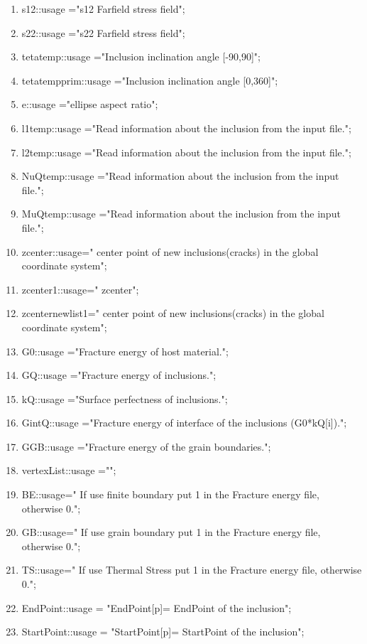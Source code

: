\documentclass[12pt]{article}
\numberwithin{equation}{subsection}
\begin{document}
\begin{enumerate}
\item s12::usage ="s12 Farfield stress field";
\item s22::usage ="s22 Farfield stress field";
\item tetatemp::usage ="Inclusion inclination angle [-90,90]";
\item tetatempprim::usage ="Inclusion inclination angle [0,360]";
\item e::usage ="ellipse aspect ratio";
\item l1temp::usage ="Read information about the inclusion from the input file.";
\item l2temp::usage ="Read information about the inclusion from the input file.";
\item NuQtemp::usage ="Read information about the inclusion from the input file.";
\item MuQtemp::usage ="Read information about the inclusion from the input file.";
\item zcenter::usage=" center point of new inclusions(cracks) in the global coordinate system"; 
\item zcenter1::usage=" zcenter"; 
\item zcenternewlist1=" center point of new inclusions(cracks) in the global coordinate system"; 
\item G0::usage ="Fracture energy of host material.";
\item GQ::usage ="Fracture energy of inclusions.";
\item kQ::usage ="Surface perfectness of inclusions.";
\item GintQ::usage ="Fracture energy of interface of the inclusions (G0*kQ[i]).";
\item GGB::usage ="Fracture energy of the grain boundaries.";
\item vertexList::usage ="";
\item BE::usage=" If use finite boundary put 1 in the Fracture energy file, otherwise 0."; 
\item GB::usage=" If use grain boundary put 1 in the Fracture energy file, otherwise 0."; 
\item TS::usage=" If use Thermal Stress put 1 in the Fracture energy file, otherwise 0."; 
\item EndPoint::usage = "EndPoint[p]= EndPoint of the inclusion"; 
\item StartPoint::usage = "StartPoint[p]= StartPoint of the inclusion"; 


\end{enumerate}
\end{document}
